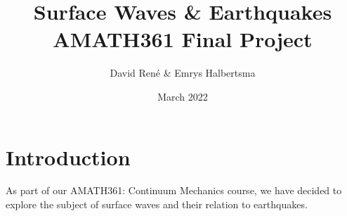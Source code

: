 \documentclass{article}
\title{Surface Waves \& Earthquakes\\AMATH361 Final Project}
\author{David René \& Emrys Halbertsma}
\date{March 2022}
\begin{document}
\maketitle
\newpage

\section{Introduction}
As part of our AMATH361: Continuum Mechanics course, we have decided to explore the subject of surface waves and their relation to earthquakes.
\end{document}
